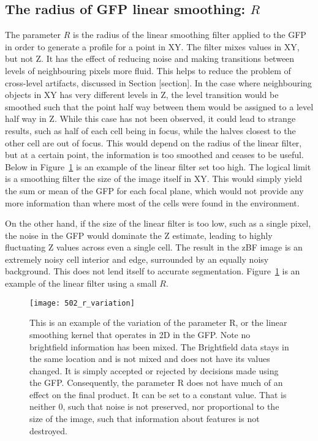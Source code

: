 \subsection{The radius of GFP linear smoothing: $R$}

The parameter $R$ is the radius of the linear smoothing filter applied to the GFP in order to generate a profile for a point in XY. The filter mixes values in XY, but not Z. It has the effect of reducing noise and making transitions between levels of neighbouring pixels more fluid. This helps to reduce the problem of cross-level artifacts, discussed in Section [section]. In the case where neighbouring objects in XY has very different levels in Z, the level transition would be smoothed such that the point half way between them would be assigned to a level half way in Z. While this case has not been observed, it could lead to strange results, such as half of each cell being in focus, while the halves closest to the other cell are out of focus. This would depend on the radius of the linear filter, but at a certain point, the information is too smoothed and ceases to be useful. Below in Figure~\ref{fig:rvariation} is an example of the linear filter set too high. The logical limit is a smoothing filter the size of the image itself in XY. This would simply yield the sum or mean of the GFP for each focal plane, which would not provide any more information than where most of the cells were found in the environment.

On the other hand, if the size of the linear filter is too low, such as a single pixel, the noise in the GFP would dominate the Z estimate, leading to highly fluctuating Z values across even a single cell. The result in the zBF image is an extremely noisy cell interior and edge, surrounded by an equally noisy background. This does not lend itself to accurate segmentation. Figure~\ref{fig:rvariation} is an example of the linear filter using a small $R$.

\begin{figure}[h!]
 \centering
 \texttt{[image: 502\_r\_variation]}
 \caption[Varying R]{
 	This is an example of the variation of the parameter R, or the linear smoothing kernel that operates in 2D in the GFP. Note no brightfield information has been mixed. The Brightfield data stays in the same location and is not mixed and does not have its values changed. It is simply accepted or rejected by decisions made using the GFP. Consequently, the parameter R does not have much of an effect on the final product. It can be set to a constant value. That is neither 0, such that noise is not preserved, nor proportional to the size of the image, such that information about features is not destroyed.
 }
 \label{fig:rvariation}
\end{figure}

